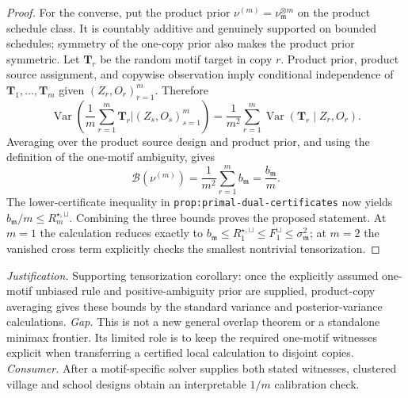 \documentclass{article}
\begin{document}
\begin{proof}
For the converse, put the product prior \(\nu^{(m)}=\nu_{\mathfrak m}^{\otimes m}\) on the product schedule class.  It is countably additive and genuinely supported on bounded schedules; symmetry of the one-copy prior also makes the product prior symmetric.  Let \(\mathbf T_r\) be the random motif target in copy \(r\).  Product prior, product source assignment, and copywise observation imply conditional independence of \(\mathbf T_1,\ldots,\mathbf T_m\) given \((Z_r,O_r)_{r=1}^m\).  Therefore
\[
 \operatorname{Var}\!\left(
 \frac1m\sum_{r=1}^m\mathbf T_r
 \mathrel{\Big|}(Z_s,O_s)_{s=1}^m\right)
 =\frac1{m^2}\sum_{r=1}^m
 \operatorname{Var}(\mathbf T_r\mid Z_r,O_r).
\]
Averaging over the product source design and product prior, and using the definition of the one-motif ambiguity, gives
\[
 \mathcal B(\nu^{(m)})
 =\frac1{m^2}\sum_{r=1}^mb_{\mathfrak m}
 =\frac{b_{\mathfrak m}}m.
\]
The lower-certificate inequality in \texttt{prop:primal-dual-certificates} now yields \(b_{\mathfrak m}/m\le R_m^{\star,\sqcup}\).  Combining the three bounds proves the proposed statement.  At \(m=1\) the calculation reduces exactly to \(b_{\mathfrak m}\le R_1^{\star,\sqcup}\le F_1^{\sqcup}\le\sigma_{\mathfrak m}^2\); at \(m=2\) the vanished cross term explicitly checks the smallest nontrivial tensorization.
\end{proof}
\par\smallskip\noindent \textit{Justification.} Supporting tensorization corollary: once the explicitly assumed one-motif unbiased rule and positive-ambiguity prior are supplied, product-copy averaging gives these bounds by the standard variance and posterior-variance calculations. \textit{Gap.} This is not a new general overlap theorem or a standalone minimax frontier. Its limited role is to keep the required one-motif witnesses explicit when transferring a certified local calculation to disjoint copies. \textit{Consumer.} After a motif-specific solver supplies both stated witnesses, clustered village and school designs obtain an interpretable \(1/m\) calibration check.
\end{document}
